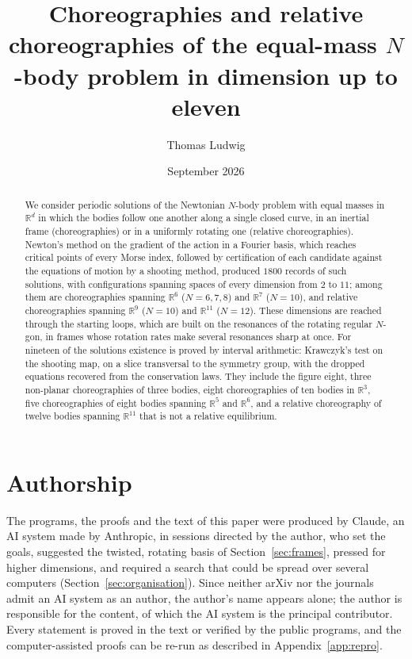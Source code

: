 \documentclass[11pt]{amsart}
\title[Choreographies of the $N$-body problem in dimension up to eleven]{Choreographies and relative choreographies of the equal-mass $N$-body problem in dimension up to eleven}
\author{Thomas Ludwig}
\date{September 2026}
\theoremstyle{definition}
\newcommand{\R}{\mathbb{R}}
\begin{document}
\begin{abstract}
We consider periodic solutions of the Newtonian $N$-body problem with equal masses in $\R^d$ in which the bodies follow one another along a single closed curve, in an inertial frame (choreographies) or in a uniformly rotating one (relative choreographies). Newton's method on the gradient of the action in a Fourier basis, which reaches critical points of every Morse index, followed by certification of each candidate against the equations of motion by a shooting method, produced $1800$ records of such solutions, with configurations spanning spaces of every dimension from $2$ to $11$; among them are choreographies spanning $\R^6$ ($N=6,7,8$) and $\R^7$ ($N=10$), and relative choreographies spanning $\R^9$ ($N=10$) and $\R^{11}$ ($N=12$). These dimensions are reached through the starting loops, which are built on the resonances of the rotating regular $N$-gon, in frames whose rotation rates make several resonances sharp at once. For nineteen of the solutions existence is proved by interval arithmetic: Krawczyk's test on the shooting map, on a slice transversal to the symmetry group, with the dropped equations recovered from the conservation laws. They include the figure eight, three non-planar choreographies of three bodies, eight choreographies of ten bodies in $\R^3$, five choreographies of eight bodies spanning $\R^5$ and $\R^6$, and a relative choreography of twelve bodies spanning $\R^{11}$ that is not a relative equilibrium.
\end{abstract}

\maketitle

\section*{Authorship}
The programs, the proofs and the text of this paper were produced by Claude, an AI system made by Anthropic, in sessions directed by the author, who set the goals, suggested the twisted, rotating basis of Section~\ref{sec:frames}, pressed for higher dimensions, and required a search that could be spread over several computers (Section~\ref{sec:organisation}). Since neither arXiv nor the journals admit an AI system as an author, the author's name appears alone; the author is responsible for the content, of which the AI system is the principal contributor. Every statement is proved in the text or verified by the public programs, and the computer-assisted proofs can be re-run as described in Appendix~\ref{app:repro}.
\end{document}
